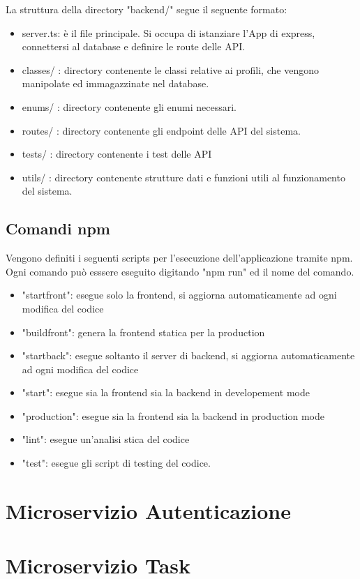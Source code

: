 \documentclass{report}
\begin{document}
La struttura della directory "backend/" segue il seguente formato:
\begin{itemize}
	\item server.ts: è il file principale. Si occupa di istanziare l'App di express, 
	connettersi al database e definire le route delle API.
	\item classes/ : directory contenente le classi relative ai profili, che vengono manipolate ed immagazzinate nel database.
	\item enums/ : directory contenente gli enumi necessari.
	\item routes/ : directory contenente gli endpoint delle API del sistema.
	\item tests/ : directory contenente i test delle API
	\item utils/ : directory contenente strutture dati e funzioni utili al funzionamento del sistema.
\end{itemize} 

\subsection{Comandi npm}
Vengono definiti i seguenti scripts per l'esecuzione dell'applicazione tramite npm. Ogni comando può esssere eseguito digitando "npm run" ed il nome del comando.
\begin{itemize}
	\item "startfront": esegue solo la frontend, si aggiorna automaticamente ad ogni modifica del codice
	\item "buildfront": genera la frontend statica per la production
	\item "startback": esegue soltanto il server di backend, si aggiorna automaticamente ad ogni modifica del codice
	\item "start": esegue sia la frontend sia la backend in developement mode
	\item "production": esegue sia la frontend sia la backend in production mode
	\item "lint": esegue un'analisi stica del codice
	\item "test": esegue gli script di testing del codice.
\end{itemize}
	

\section{Microservizio Autenticazione}

\section{Microservizio Task}
\end{document}
